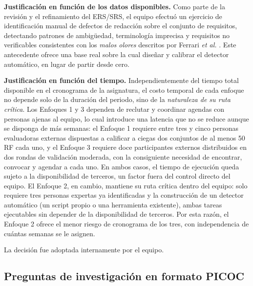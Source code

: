 \documentclass[journal,onecolumn]{IEEEtran}
\begin{document}
	\textbf{Justificación en función de los datos disponibles.} Como parte de
	la revisión y el refinamiento del ERS/SRS, el equipo efectuó un ejercicio
	de identificación manual de defectos de redacción sobre el conjunto de
	requisitos, detectando patrones de ambigüedad, terminología imprecisa y
	requisitos no verificables consistentes con los \emph{malos olores}
	descritos por Ferrari \emph{et al.} \cite{ferrari2016}. Este antecedente
	ofrece una base real sobre la cual diseñar y calibrar el detector
	automático, en lugar de partir desde cero.
	
	\textbf{Justificación en función del tiempo.} Independientemente del tiempo
	total disponible en el cronograma de la asignatura, el costo temporal de
	cada enfoque no depende solo de la duración del periodo, sino de la
	\emph{naturaleza de su ruta crítica}. Los Enfoques 1 y 3 dependen de
	reclutar y coordinar agendas con personas ajenas al equipo, lo cual introduce
	una latencia que no se reduce aunque se disponga de más semanas: el
	Enfoque 1 requiere entre tres y cinco personas evaluadoras externas
	dispuestas a calificar a ciegas dos conjuntos de al menos 50 RF cada uno, y
	el Enfoque 3 requiere doce participantes externos distribuidos en dos rondas
	de validación moderada, con la consiguiente necesidad de encontrar,
	convocar y agendar a cada uno. En ambos casos, el tiempo de ejecución queda
	sujeto a la disponibilidad de terceros, un factor fuera del control directo
	del equipo. El Enfoque 2, en cambio, mantiene su ruta crítica dentro del
	equipo: solo requiere tres personas expertas ya identificadas y la
	construcción de un detector automático (un script propio o una herramienta
	existente), ambas tareas ejecutables sin depender de la disponibilidad de
	terceros. Por esta razón, el Enfoque 2 ofrece el menor riesgo de cronograma
	de los tres, con independencia de cuántas semanas se le asignen.
	
	La decisión fue adoptada internamente por el equipo.
	
	\subsection{Preguntas de investigación en formato PICOC}
	\label{sec:rq}
	
\end{document}
